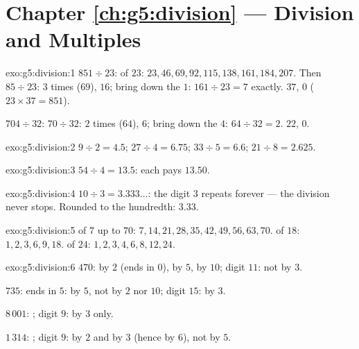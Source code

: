 \section*{Chapter \ref{ch:g5:division} --- Division and Multiples}

\begin{solution}{exo:g5:division:1}
$851 \div 23$:  of $23$: $23, 46, 69, 92, 115, 138, 161,
184, 207$. Then $85 \div 23$: $3$ times ($69$),  $16$;
bring down the $1$: $161 \div 23 = 7$ exactly.  $37$,
 $0$ ($23 \times 37 = 851$).

$704 \div 32$: $70 \div 32$: $2$ times ($64$),  $6$; bring
down the $4$: $64 \div 32 = 2$.  $22$,  $0$.
\end{solution}

\begin{solution}{exo:g5:division:2}
$9 \div 2 = 4.5$; \quad $27 \div 4 = 6.75$; \quad
$33 \div 5 = 6.6$; \quad $21 \div 8 = 2.625$.
\end{solution}

\begin{solution}{exo:g5:division:3}
$54 \div 4 = 13.5$: each pays $13.50$.
\end{solution}

\begin{solution}{exo:g5:division:4}
$10 \div 3 = 3.333\dots$: the digit $3$ repeats forever --- the
division never stops. Rounded to the hundredth: $3.33$.
\end{solution}

\begin{solution}{exo:g5:division:5}
 of $7$ up to $70$: $7, 14, 21, 28, 35, 42, 49, 56, 63,
70$.  of $18$: $1, 2, 3, 6, 9, 18$.  of $24$:
$1, 2, 3, 4, 6, 8, 12, 24$.
\end{solution}

\begin{solution}{exo:g5:division:6}
$470$: by $2$ (ends in $0$), by $5$, by $10$; digit  $11$: not by
$3$.

$735$: ends in $5$: by $5$, not by $2$ nor $10$; digit  $15$: by
$3$.

$8\,001$: ; digit  $9$: by $3$ only.

$1\,314$: ; digit  $9$: by $2$ and by $3$ (hence by $6$),
not by $5$.
\end{solution}

